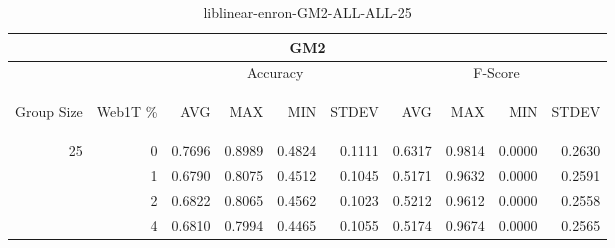 \begin{center}
\begin{table}[htbp] 
 \begin{center}
\begin{tabular}{ | r | r | r | r | r | r | r | r | r | r |}
\hline
\multicolumn{10}{|c|}{GM2}\\
\hline
 & & \multicolumn{4}{|c|}{Accuracy} & \multicolumn{4}{|c|}{F-Score}\\ \cline{3-10}
\begin{sideways}Group Size\end{sideways} & \begin{sideways}Web1T \%\end{sideways} & \begin{sideways}AVG\end{sideways} & \begin{sideways}MAX\end{sideways} & \begin{sideways}MIN\end{sideways} & \begin{sideways}STDEV\end{sideways} & \begin{sideways}AVG\end{sideways} & \begin{sideways}MAX\end{sideways} & \begin{sideways}MIN\end{sideways} & \begin{sideways}STDEV\end{sideways}\\
\hline
\multirow{3}{*}{25}
 & 0 & 0.7696 & 0.8989 & 0.4824 & 0.1111 & 0.6317 & 0.9814 & 0.0000 & 0.2630\\ \cline{2-10}
 & 1 & 0.6790 & 0.8075 & 0.4512 & 0.1045 & 0.5171 & 0.9632 & 0.0000 & 0.2591\\ \cline{2-10}
 & 2 & 0.6822 & 0.8065 & 0.4562 & 0.1023 & 0.5212 & 0.9612 & 0.0000 & 0.2558\\ \cline{2-10}
 & 4 & 0.6810 & 0.7994 & 0.4465 & 0.1055 & 0.5174 & 0.9674 & 0.0000 & 0.2565\\ \cline{2-10}
\hline
\end{tabular}
\caption{liblinear-enron-GM2-ALL-ALL-25}
\label{table:liblinear-enron-GM2-ALL-ALL-25}
\end{center}
 \end{table}
\end{center}

